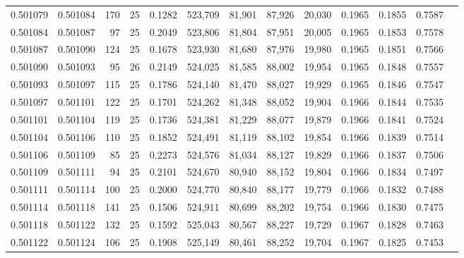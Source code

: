 \begin{tabular}{rrrrrrrrrrrrr}
0.501079 & 0.501084 & 170 &  25 &                                     0.1282 & 523,709 &  81,901 &  87,926 &  20,030 & 0.1965 & 0.1855 & 0.7587 \\
0.501084 & 0.501087 &  97 &  25 &                                     0.2049 & 523,806 &  81,804 &  87,951 &  20,005 & 0.1965 & 0.1853 & 0.7578 \\
0.501087 & 0.501090 & 124 &  25 &                                     0.1678 & 523,930 &  81,680 &  87,976 &  19,980 & 0.1965 & 0.1851 & 0.7566 \\
0.501090 & 0.501093 &  95 &  26 &                                     0.2149 & 524,025 &  81,585 &  88,002 &  19,954 & 0.1965 & 0.1848 & 0.7557 \\
0.501093 & 0.501097 & 115 &  25 &                                     0.1786 & 524,140 &  81,470 &  88,027 &  19,929 & 0.1965 & 0.1846 & 0.7547 \\
0.501097 & 0.501101 & 122 &  25 &                                     0.1701 & 524,262 &  81,348 &  88,052 &  19,904 & 0.1966 & 0.1844 & 0.7535 \\
0.501101 & 0.501104 & 119 &  25 &                                     0.1736 & 524,381 &  81,229 &  88,077 &  19,879 & 0.1966 & 0.1841 & 0.7524 \\
0.501104 & 0.501106 & 110 &  25 &                                     0.1852 & 524,491 &  81,119 &  88,102 &  19,854 & 0.1966 & 0.1839 & 0.7514 \\
0.501106 & 0.501109 &  85 &  25 &                                     0.2273 & 524,576 &  81,034 &  88,127 &  19,829 & 0.1966 & 0.1837 & 0.7506 \\
0.501109 & 0.501111 &  94 &  25 &                                     0.2101 & 524,670 &  80,940 &  88,152 &  19,804 & 0.1966 & 0.1834 & 0.7497 \\
0.501111 & 0.501114 & 100 &  25 &                                     0.2000 & 524,770 &  80,840 &  88,177 &  19,779 & 0.1966 & 0.1832 & 0.7488 \\
0.501114 & 0.501118 & 141 &  25 &                                     0.1506 & 524,911 &  80,699 &  88,202 &  19,754 & 0.1966 & 0.1830 & 0.7475 \\
0.501118 & 0.501122 & 132 &  25 &                                     0.1592 & 525,043 &  80,567 &  88,227 &  19,729 & 0.1967 & 0.1828 & 0.7463 \\
0.501122 & 0.501124 & 106 &  25 &                                     0.1908 & 525,149 &  80,461 &  88,252 &  19,704 & 0.1967 & 0.1825 & 0.7453 \\

\end{tabular}

